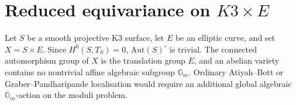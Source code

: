 
\providecommand{\Coh}{\mathrm{Coh}}
\providecommand{\Hilb}{\mathrm{Hilb}}
\providecommand{\Db}{D^{b}}
\providecommand{\PT}{\mathrm{PT}}
\providecommand{\DT}{\mathrm{DT}}
\providecommand{\CoHA}{\mathrm{CoHA}}
\providecommand{\cO}{\mathcal O}
\providecommand{\cH}{\mathcal H}
\providecommand{\cF}{\mathcal F}
\providecommand{\bC}{\mathbb C}
\providecommand{\bQ}{\mathbb Q}
\providecommand{\bZ}{\mathbb Z}
\providecommand{\bP}{\mathbb P}
\providecommand{\bH}{\mathbb H}
\providecommand{\Gm}{\mathbb G_m}
\providecommand{\vir}{\mathrm{vir}}
\providecommand{\kch}{\kappa_{\mathrm{ch}}}
\providecommand{\kcat}{\kappa_{\mathrm{cat}}}
\providecommand{\kbkm}{\kappa_{\mathrm{BKM}}}
\providecommand{\kfib}{\kappa_{\mathrm{fiber}}}
\providecommand{\Deltafive}{\Delta_5}
\providecommand{\Dfive}{D_5}
\providecommand{\PhiOP}{\Phi_{10}^{\mathrm{OP}}}

\section*{Reduced equivariance on $K3\times E$}

Let \(S\) be a smooth projective K3 surface, let \(E\) be an elliptic
curve, and set \(X=S\times E\).  Since \(H^0(S,T_S)=0\),
\(\mathrm{Aut}(S)^\circ\) is trivial.  The connected automorphism group
of \(X\) is the translation group \(E\), and an abelian variety contains
no nontrivial affine algebraic subgroup \(\Gm\).  Ordinary
Atiyah--Bott or Graber--Pandharipande localisation would require an
additional global algebraic \(\Gm\)-action on the moduli problem.

